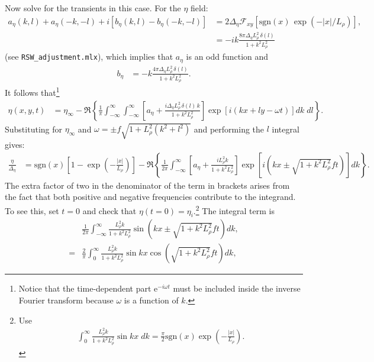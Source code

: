 \documentclass[10pt,reqno]{amsart}
\newcommand{\expe}{{\mathrm e}}
\newcommand{\sign}{\mathrm{sgn}}
\begin{document}
Now solve for the transients in this case.
For the $\eta$ field:
\begin{align}
a_\eta (k,l) + a_\eta (-k,-l) + i \left[ b_\eta (k,l) - b_\eta (-k,-l) \right]  & = 2 \Delta_\eta {\mathcal F}_{xy} \left[ \sign(x) \,   \exp \left( - |x| / L_\rho \right)  \right] ,   \\
& = -i k \frac{8 \pi \Delta_\eta L_\rho^2 \, \delta (l) }{ 1 + k^2 L_\rho^2 }    
\end{align}
(see \texttt{RSW\_adjustment.mlx}), which implies that $a_\eta$ is an odd function and
\begin{align}
b_\eta & =  -k \frac{4 \pi \Delta_\eta L_\rho^2 \, \delta (l) }{ 1 + k^2 L_\rho^2 } .   
\end{align}
It follows that\footnote{Notice that the time-dependent part $\expe^{-i \omega t}$ must be included inside the inverse Fourier transform because $\omega$ is a function of $k$.}
\begin{align}
\eta (x, y, t) & = 
\eta_{\infty} - \Re \left\{ \frac{1}{ \pi} \int _{-\infty} ^{\infty} \int_{-\infty}^{\infty} \left[ a_\eta + \frac{i \Delta_\eta L_\rho^2 \, \delta (l) \, k }{ 1 + k^2 L_\rho^2 } \right] \exp \left[ i \left( k x + l y - \omega t \right) \right] dk \; dl  \right\}.  
\label{eqn:inf_plane_eg_eta_intermediate0}
\end{align}
Substituting for $\eta_{\infty}$ and $\omega = \pm f \sqrt{1 + L_\rho^2 ( k^ 2 + l^2) }$ and performing the $l$ integral gives:
\begin{align}
\frac{\eta}{\Delta_\eta}
& = \sign(x) \left[ 1 - \exp \left( - \frac{|x|}{L_\rho} \right) \right] -
\Re \left\{ \frac{1}{2 \pi} \int_{-\infty}^{\infty} \left[ a_\eta + \frac{i L_\rho^2  k}{ 1 + k^2 L_\rho^2 } \right] \exp \left[ i \left( k x \pm \sqrt{1 + k^2 L_\rho^2 } f t \right) \right] dk \right\} .  
\label{eqn:inf_plane_eg_eta_intermediate}
\end{align}
The extra factor of two in the denominator of the term in brackets arises from the fact that both positive and negative frequencies contribute to the integrand. 
To see this, set $t=0$ and check that $\eta(t=0) = \eta_i$.\footnote{Use
\begin{align}
\int_{0}^{\infty} \frac{ L_\rho^2 k}{ 1 + k^2 L_\rho^2 } \sin k x  \; dk  = \frac{\pi}{2} \sign(x) \exp \left(-\frac{|x|}{L_\rho} \right) .  
\end{align}
}
The integral term is
\begin{align}
& \frac{1}{2 \pi} \int_{-\infty}^{\infty} \frac{ L_\rho^2 k}{ 1 + k^2 L_\rho^2 } \sin \left( k x \pm \sqrt{1 + k^2 L_\rho^2 } f t \right) dk ,    \\
=& \frac{2}{\pi} \int_{0}^{\infty} \frac{ L_\rho^2 k}{ 1 + k^2 L_\rho^2 } \sin k x \cos\left( \sqrt{1 + k^2 L_\rho^2 } f t \right) dk ,   
\end{align}
\end{document}
